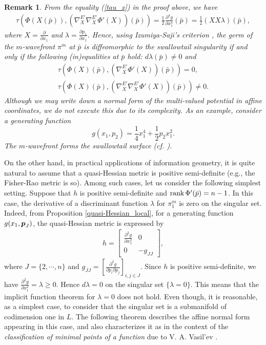 \documentclass[10pt]{amsart}
\newcommand\rank{\mbox{\rm rank}\,}
\def\rd{\partial}
\def\bp{\mbox{\boldmath $p$}}
\newtheorem{rem}[thm]{\bf Remark}
\begin{document}
\begin{rem}\upshape
From the equality (\ref{tau_x}) in the proof above, we have
\begin{align}\label{tau_xx}
\tau(\Phi(X(\bar{p})), (\nabla^{E'}_{X}\nabla^{E'}_{X}\Phi'(X))(\bar{p})) = \frac{1}{2}\frac{\rd^4 g}{\rd x_1^4}(\bar{p})
= \frac{1}{2}(XX\lambda)(\bar{p}),
\end{align}
where $X=\frac{\rd}{\rd x_1}$ and $\lambda=\frac{\rd p_1}{\rd x_1}$. 
Hence, using Izumiya-Saji's criterion \cite{IS}, 
the germ of the $m$-wavefront $\pi^m$ at $\bar{p}$ is diffeomorphic to the swallowtail singularity if and only if the following (in)equalities at $\bar{p}$ hold: $d\lambda(\bar{p})\neq 0$ and  
\begin{align*}
  \tau(\Phi(X)(\bar{p}), (\nabla^{E'}_{X}\Phi'(X))(\bar{p})) = 0,\\
\tau(\Phi(X)(\bar{p}), (\nabla^{E'}_{X}\nabla^{E'}_{X}\Phi'(X))(\bar{p})) \neq 0. 
\end{align*}
Although we may write down a normal form of the multi-valued potential in affine coordinates, we do not execute this due to its complexity. 
As an example, consider a generating function 
$$g(x_1, p_2)=\frac{1}{4} x_1^4 + \frac{1}{2} p_2 x_1^2.$$
The $m$-wavefront forms the swallowtail surface (cf. \cite{AGV}). 
\end{rem}



On the other hand, in practical applications of information geometry, it is quite natural to assume that a quasi-Hessian metric is positive semi-definite (e.g., the Fisher-Rao metric is so). 
Among such cases, let us consider the following simplest setting.
Suppose that $h$ is positive semi-definite and $\rank \Phi'(\bar{p})=n-1$.
In this case, the derivative of a discriminant function $\lambda$ for $\pi^m_1$ is zero on the singular set.
Indeed, from Proposition \ref{quasi-Hessian_local}, for a generating function $g(x_1,\bp_J)$, the quasi-Hessian metric is expressed by
\begin{align*}
h =
\begin{bmatrix}
\frac{\rd^2 g}{\rd x_1^2} & 0\\
0 & -g_{JJ}
\end{bmatrix},
\end{align*}
where $J=\{2,\cdots,n\}$ and $g_{JJ} = [\frac{\rd^2 g}{\rd p_i \rd p_j}]_{i,j\in J}$. Since $h$ is positive semi-definite, we have $\frac{\rd^2 g}{\rd x_1^2}=\lambda \geq 0$. Hence $d\lambda = 0$ on the singular set $\{\lambda=0\}$.
This means that the implicit function theorem for $\lambda=0$ does not hold.
Even though, it is reasonable, as a simplest case, to consider that the singular set is a submanifold of codimension one in $L$.
The following theorem describes the affine normal form appearing in this case, and also characterizes it as in the context of the {\em classification of minimal points of a function} due to V. A. Vasil'ev \cite{Vasil'ev}.
\end{document}
